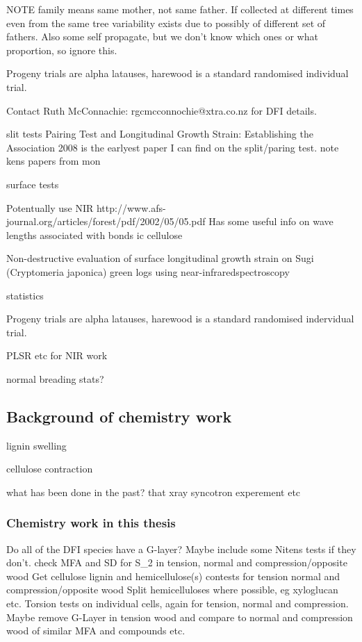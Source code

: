 \documentclass{article}
\begin{document}
NOTE family means same mother, not same father.
If collected at different times even from the same tree variability exists due
to possibly of different set of fathers. Also some self propagate, but we don't
know which ones or what proportion, so ignore this.

Progeny trials are alpha latauses, harewood is a standard randomised individual
trial.

Contact Ruth McConnachie: rgcmcconnochie@xtra.co.nz for DFI details.

slit tests
Pairing Test and Longitudinal Growth Strain: Establishing the Association 2008
is the earlyest paper I can find on the split/paring test. note kens papers from
mon

surface tests

Potentually use NIR
http://www.afs-journal.org/articles/forest/pdf/2002/05/05.pdf
Has some useful info on wave lengths associated with bonds ic cellulose

Non-destructive evaluation of surface longitudinal growth strain
on Sugi (Cryptomeria japonica) green logs using near-infraredspectroscopy

statistics

Progeny trials are alpha latauses, harewood is a standard randomised indervidual
trial.

PLSR etc for NIR work

normal breading stats?

\subsection{Background of chemistry work}

lignin swelling

cellulose contraction

what has been done in the past?
that xray syncotron experement etc

\subsubsection{Chemistry work in this thesis}

Do all of the DFI species have a G-layer?
Maybe include some Nitens tests if they don't.
check MFA and SD for S\_2 in tension, normal and compression/opposite wood
Get cellulose lignin and hemicellulose(s) contests for tension normal and
compression/opposite wood Split hemicelluloses where possible, eg xyloglucan
etc.
Torsion tests on individual cells, again for tension, normal and compression. Maybe remove G-Layer
in tension wood and compare to normal and compression wood of similar MFA and compounds etc.
\end{document}
